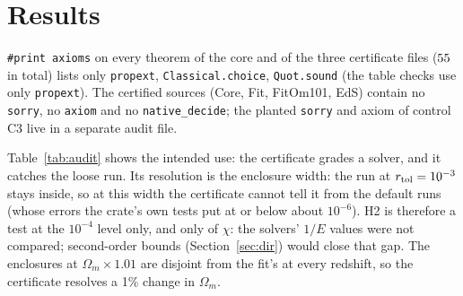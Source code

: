 \documentclass[11pt]{article}
\theoremstyle{remark}
\begin{document}
\section{Results}
\begin{table}[h]\centering\small

\caption{Kernel-checked enclosures of $\chi(z)$ and of $1/E(z)$ at the fit point (\texttt{formal\_cert/BAOCert/Fit.lean}); $D_M/r_d$ and
$D_H/r_d$ are these bounds times the exact rational $c/(100\,hr_d)$, computed outside Lean.}\label{tab:enc}
\end{table}

\texttt{\#print axioms} on every theorem of the core and of the three certificate files ($55$ in total) lists only
\texttt{propext}, \texttt{Classical.choice}, \texttt{Quot.sound} (the table checks use only \texttt{propext}). The certified sources
(Core, Fit, FitOm101, EdS) contain no \texttt{sorry}, no \texttt{axiom} and no \texttt{native\_decide}; the planted \texttt{sorry} and
axiom of control C3 live in a separate audit file.

\begin{table}[h]\centering\small

\caption{Solver audit against the enclosures (``in'': inside; ``out'': outside by the given absolute amount in $\chi$). Columns:
rusty-SUNDIALS CVODE at $(r_{\rm tol},a_{\rm tol})=(10^{-7},10^{-10})$ (its default), $(10^{-3},10^{-6})$ and $(10^{-2},10^{-2})$; its adaptive Gauss--Kronrod quadrature (default);
astropy 6.1.7 \texttt{FlatLambdaCDM(H0=70, Om0=0.29743, Tcmb0=0)}. The rusty-SUNDIALS code is the \texttt{qf-bao-distances} crate on the
branch of its PR \#63.}\label{tab:audit}
\end{table}

Table~\ref{tab:audit} shows the intended use: the certificate grades a solver, and it catches the loose run. Its resolution is the
enclosure width: the run at $r_{\rm tol}=10^{-3}$ stays inside, so at this width the certificate cannot tell it from the default runs
(whose errors the crate's own tests put at or below about $10^{-6}$). H2 is therefore a test at the $10^{-4}$ level only, and only
of $\chi$: the solvers' $1/E$ values were not compared; second-order bounds (Section~\ref{sec:dir}) would close that gap.
The enclosures at $\Omega_m\times1.01$ are disjoint from the fit's at every redshift, so the certificate resolves a 1\% change in $\Omega_m$.

\begin{table}[h]\centering\small

\caption{DESI DR2 BAO measurements~\cite{desi} against predictions from the certified bounds at the fit point (conversion outside Lean); pulls use the diagonal errors only and are
computed outside Lean. The $D_V/r_d$ bin is not certified (it needs a cube-root enclosure).}\label{tab:desi}
\end{table}
\end{document}
